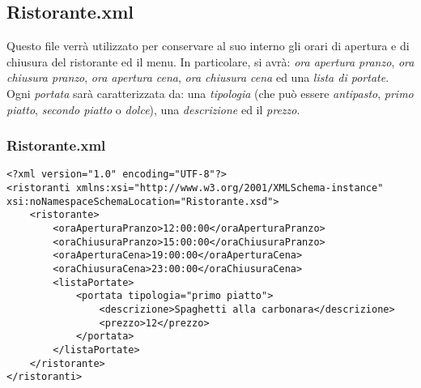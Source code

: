 \documentclass [a4paper, 12pt]{book}
\begin{document}
\subsection{Ristorante.xml}
Questo file verrà utilizzato per conservare al suo interno gli orari di apertura e di chiusura del ristorante ed il menu. In particolare, si avrà: \textit{ora apertura pranzo}, \textit{ora chiusura pranzo}, \textit{ora apertura cena}, \textit{ora chiusura cena} ed una \textit{lista di portate}. Ogni \textit{portata} sarà caratterizzata da:
una \textit{tipologia} (che può essere \textit{antipasto}, \textit{primo piatto}, \textit{secondo piatto} o \textit{dolce}), una \textit{descrizione} ed il \textit{prezzo}.
\subsubsection{Ristorante.xml}
\begin{lstlisting}[style=XML]
<?xml version="1.0" encoding="UTF-8"?>
<ristoranti xmlns:xsi="http://www.w3.org/2001/XMLSchema-instance" xsi:noNamespaceSchemaLocation="Ristorante.xsd">
    <ristorante>
        <oraAperturaPranzo>12:00:00</oraAperturaPranzo>
        <oraChiusuraPranzo>15:00:00</oraChiusuraPranzo>
        <oraAperturaCena>19:00:00</oraAperturaCena>
        <oraChiusuraCena>23:00:00</oraChiusuraCena>
        <listaPortate>
            <portata tipologia="primo piatto">
                <descrizione>Spaghetti alla carbonara</descrizione>
                <prezzo>12</prezzo>
            </portata>
        </listaPortate>
    </ristorante>
</ristoranti>
\end{lstlisting}
\end{document}
